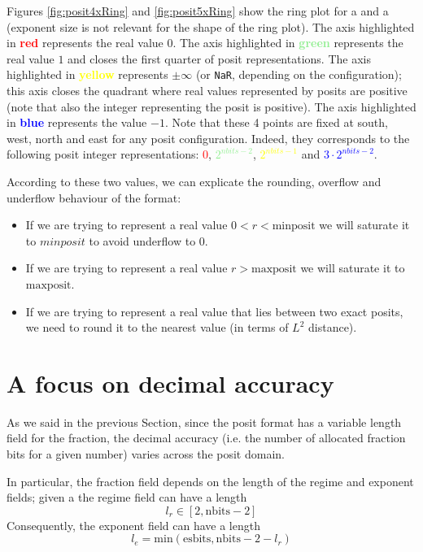 Figures \ref{fig:posit4xRing} and \ref{fig:posit5xRing} show the ring plot for a  and a  (exponent size is not relevant for the shape of the ring plot). The axis highlighted in \textbf{\textcolor{red}{red}} represents the real value $0$. The axis highlighted in \textbf{\textcolor{lightgreen}{green}} represents the real value $1$ and closes the first quarter of posit representations. The axis highlighted in \textbf{\textcolor{yellow}{yellow}} represents $\pm \infty$ (or \texttt{NaR}, depending on the configuration); this axis closes the quadrant where real values represented by posits are positive (note that also the integer representing the posit is positive). The axis highlighted in \textbf{\textcolor{blue}{blue}} represents the value $-1$. Note that these 4 points are fixed at south, west, north and east for any posit configuration. Indeed, they corresponds to the following posit integer representations: \textcolor{red}{0}, \textcolor{lightgreen}{$2^{nbits-2}$}, \textcolor{yellow}{$2^{nbits - 1}$} and \textcolor{blue}{$3 \cdot 2^{nbits-2}$}.

According to these two values, we can explicate the rounding, overflow and underflow behaviour of the format:
\begin{itemize}
    \item If we are trying to represent a real value $0 < r < \text{minposit}$ we will saturate it to $minposit$ to avoid underflow to $0$.
    \item If we are trying to represent a real value $r > \text{maxposit} $ we will saturate it to $\text{maxposit}$.
    \item If we are trying to represent a real value that lies between two exact posits, we need to round it to the nearest value (in terms of $L^2$ distance).
\end{itemize}




\section{A focus on decimal accuracy}

As we said in the previous Section, since the posit format has a variable length field for the fraction, the decimal accuracy (i.e. the number of allocated fraction bits for a given number) varies across the posit domain.

In particular, the fraction field depends on the length of the regime and exponent fields; given a  the regime field can have a length 
\begin{equation}
l_r \in [2,\text{nbits}-2]
\end{equation}
Consequently, the exponent field can have a length 
\begin{equation}
l_e = \text{min}(\text{esbits},\text{nbits}-2-l_r)
\end{equation}


